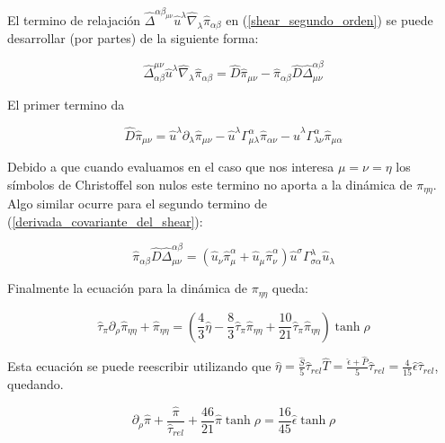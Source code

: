 \documentclass[11pt,a4paper]{article}
\begin{document}
El termino de relajación $\hat{\Delta}^{{\alpha}{\beta}_{{\mu}{\nu}}}\hat{u}^{\lambda}\hat{\nabla}_{\lambda}\hat{\pi}_{{\alpha}{\beta}}$ en (\ref{shear_segundo_orden}) se puede desarrollar (por partes) de la siguiente forma:

\begin{equation}
\hat{\Delta}^{{\mu}{\nu}}_{{\alpha}{\beta}}\hat{u}^{\lambda}\hat{\nabla}_{\lambda}\hat{\pi}_{{\alpha}{\beta}}=
\hat{D}\hat{\pi}_{{\mu}{\nu}}-
\hat{\pi}_{{\alpha}{\beta}}\hat{D}\hat{\Delta}^{{\alpha}{\beta}}_{{\mu}{\nu}}
\end{equation}

El primer termino da

\begin{equation}
\hat{D}\hat{\pi}_{{\mu}{\nu}}=
\hat{u}^{\lambda}\partial_{\lambda}\hat{\pi}_{{\mu}{\nu}}
-\hat{u}^{\lambda}\Gamma^{\alpha}_{{\mu}{\lambda}}\hat{\pi}_{{\alpha}{\nu}}
-\hat{u}^{\lambda}\Gamma^{\alpha}_{{\lambda}{\nu}}\hat{\pi}_{{\mu}{\alpha}}
\label{derivada_covariante_del_shear}
\end{equation}

Debido a que cuando evaluamos en el caso que nos interesa $\mu=\nu=\eta$ los símbolos de Christoffel son nulos este termino no aporta a la dinámica de $\pi_{{\eta}{\eta}}$. Algo similar ocurre para el segundo termino de (\ref{derivada_covariante_del_shear}):

\begin{equation}
\hat{\pi}_{{\alpha}{\beta}}\hat{D}\hat{\Delta}^{{\alpha}{\beta}}_{{\mu}{\nu}}=(\hat{u}_{\nu}\hat{\pi}^{\alpha}_{\mu}+\hat{u}_{\mu}\hat{\pi}^{\alpha}_{\nu})\hat{u}^{\sigma}\Gamma^{\lambda}_{{\sigma}{\alpha}}\hat{u}_{\lambda}
\end{equation}

Finalmente la ecuación  para la dinámica de $\pi_{{\eta}{\eta}}$ queda:

\begin{equation}
\hat{\tau}_{\pi}\partial_{\rho}\hat{\pi}_{{\eta}{\eta}}
+\hat{\pi}_{{\eta}{\eta}}=
(\frac{4}{3}\hat{\eta}-\frac{8}{3}\hat{\tau}_{\pi}\hat{\pi}_{{\eta}{\eta}}
+\frac{10}{21}\hat{\tau}_{\pi}\hat{\pi}_{{\eta}{\eta}})\tanh\rho
\end{equation}

Esta ecuación se puede reescribir utilizando que $\hat{\eta}=\frac{\hat{S}}{5}\hat{\tau}_{rel}\hat{T}=\frac{\hat{\epsilon}+\hat{P}}{5}\hat{\tau}_{rel}=\frac{4}{15}\hat{\epsilon}\hat{\tau}_{rel}$, quedando.

\begin{equation}
\partial_{\rho}\hat{\pi}+\frac{\hat{\pi}}{\hat{\tau}_{rel}}
+\frac{46}{21}\hat{\pi}\tanh\rho=
\frac{16}{45}\hat{\epsilon}\tanh\rho
\label{ecuacion_shear}
\end{equation}
\end{document}
